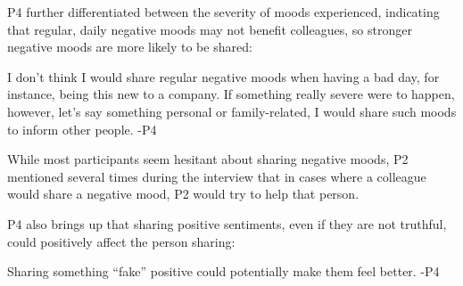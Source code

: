 

P4 further differentiated between the severity of moods experienced, indicating that regular, daily negative moods may not benefit colleagues, so stronger negative moods are more likely to be shared:

\begin{displayquote}
    I don't think I would share regular negative moods when having a bad day, for instance, being this new to a company. If something really severe were to happen, however, let's say something personal or family-related, I would share such moods to inform other people. -P4
\end{displayquote}

While most participants seem hesitant about sharing negative moods, P2 mentioned several times during the interview that in cases where a colleague would share a negative mood, P2 would try to help that person.

P4 also brings up that sharing positive sentiments, even if they are not truthful, could positively affect the person sharing:

\begin{displayquote}
    Sharing something \enquote{fake} positive could potentially make them feel better. -P4
\end{displayquote}




